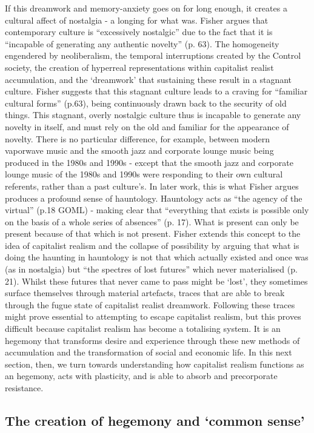 If this dreamwork and memory-anxiety goes on for long enough, it creates
a cultural affect of nostalgia - a longing for what was. Fisher argues
that contemporary culture is ``excessively nostalgic'' due to the fact
that it is ``incapable of generating any authentic novelty'' (p. 63).
The homogeneity engendered by neoliberalism, the temporal interruptions
created by the Control society, the creation of hyperreal
representations within capitalist realist accumulation, and the
`dreamwork' that sustaining these result in a stagnant culture. Fisher
suggests that this stagnant culture leads to a craving for ``familiar
cultural forms'' (p.63), being continuously drawn back to the security
of old things. This stagnant, overly nostalgic culture thus is incapable
to generate any novelty in itself, and must rely on the old and familiar
for the appearance of novelty. There is no particular difference, for
example, between modern vaporwave music and the smooth jazz and
corporate lounge music being produced in the 1980s and 1990s - except
that the smooth jazz and corporate lounge music of the 1980s and 1990s
were responding to their own cultural referents, rather than a past
culture's. In later work, this is what Fisher argues produces a profound
sense of hauntology. Hauntology acts as ``the agency of the virtual''
(p.18 GOML) - making clear that ``everything that exists is possible
only on the basis of a whole series of absences'' (p. 17). What is
present can only be present because of that which is not present. Fisher
extends this concept to the idea of capitalist realism and the collapse
of possibility by arguing that what is doing the haunting in hauntology
is not that which actually existed and once was (as in nostalgia) but
``the spectres of lost futures'' which never materialised (p. 21).
Whilst these futures that never came to pass might be `lost', they
sometimes surface themselves through material artefacts, traces that are
able to break through the fugue state of capitalist realist dreamwork.
Following these traces might prove essential to attempting to escape
capitalist realism, but this proves difficult because capitalist realism
has become a totalising system. It is an hegemony that transforms desire
and experience through these new methods of accumulation and the
transformation of social and economic life. In this next section, then,
we turn towards understanding how capitalist realism functions as an
hegemony, acts with plasticity, and is able to absorb and precorporate
resistance.

\subsection{The creation of hegemony and `common sense'}
\label{the-creation-of-hegemony-and-common-sense}

